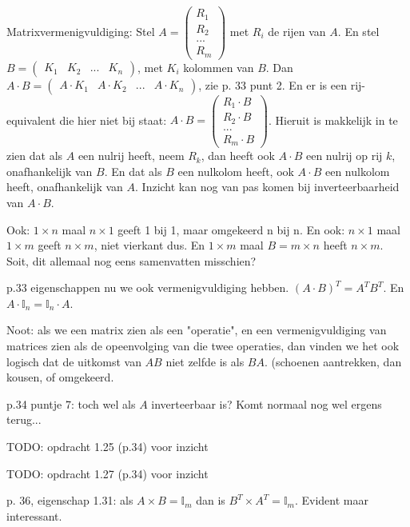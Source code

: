 \documentclass{article}
\begin{document}
Matrixvermenigvuldiging: 
Stel $A =  \begin{pmatrix} R_1 \\ R_2 \\ ... \\ R_m  \end{pmatrix}$ met $R_i$ de rijen van $A$. En stel $B = \begin{pmatrix}  K_1 & K_2 & ... & K_n \end{pmatrix}$, met $K_i$ kolommen van $B$. 
Dan $A \cdot B = \begin{pmatrix} A\cdot K_1 & A\cdot K_2 & ... & A\cdot K_n \end{pmatrix}$, zie p. 33 punt 2. 
En er is een rij-equivalent die hier niet bij staat: $A \cdot B = \begin{pmatrix} R_1\cdot B \\  R_2\cdot B \\ ... \\ R_m\cdot B \end{pmatrix}$. 
Hieruit is makkelijk in te zien dat als $A$ een nulrij heeft, neem $R_k$, dan heeft ook $A\cdot B$ een nulrij op rij $k$, onafhankelijk van $B$. En dat als $B$ een nulkolom heeft, ook $A\cdot B$ een nulkolom heeft, onafhankelijk van $A$. Inzicht kan nog van pas komen bij inverteerbaarheid van $A\cdot B$. 

Ook: $1 \times n$ maal $n \times 1$ geeft 1 bij 1, maar omgekeerd n bij n. En ook: $n \times 1$ maal $1 \times m$ geeft $n \times m$, niet vierkant dus. En $1 \times m$ maal $B = m \times n$ heeft $n \times m$. 
Soit, dit allemaal nog eens samenvatten misschien? 



p.33 eigenschappen nu we ook vermenigvuldiging hebben. $(A \cdot B)^T = A^T B^T$. En $A \cdot \mathbb{I}_n = \mathbb{I}_n \cdot A$. 

Noot: als we een matrix zien als een "operatie", en een vermenigvuldiging van matrices zien als de opeenvolging van die twee operaties, dan vinden we het ook logisch dat de uitkomst van $AB$ niet zelfde is als $BA$. (schoenen aantrekken, dan kousen, of omgekeerd. 

p.34 puntje 7: toch wel als $A$ inverteerbaar is? Komt normaal nog wel ergens terug... 

TODO: opdracht 1.25 (p.34) voor inzicht

TODO: opdracht 1.27 (p.34) voor inzicht

p. 36, eigenschap 1.31: als $A \times B = \mathbb{I}_m$ dan is  $B^T \times A^T = \mathbb{I}_m$. Evident maar interessant. 
\end{document}
